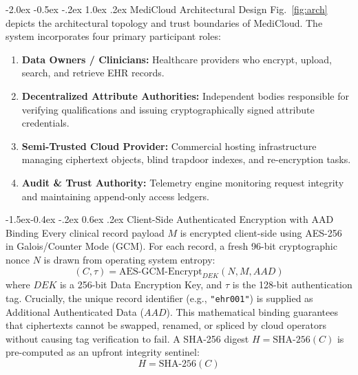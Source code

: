 \documentclass[10pt,twocolumn]{article}
\makeatletter
\renewcommand\section{\@startsection {section}{1}{\z@}%
  {-2.0ex \@plus -0.5ex \@minus -.2ex}%
  {1.0ex \@plus .2ex}%
  {\normalfont\normalsize\bfseries\scshape\color{primary}}}
\renewcommand\subsection{\@startsection{subsection}{2}{\z@}%
  {-1.5ex\@plus -0.4ex \@minus -.2ex}%
  {0.6ex \@plus .2ex}%
  {\normalfont\normalsize\bfseries\itshape\color{accent}}}
\makeatother
\begin{document}
\section{MediCloud Architectural Design}
Fig.~\ref{fig:arch} depicts the architectural topology and trust boundaries of MediCloud. The system incorporates four primary participant roles:
\begin{enumerate}
    \item \textbf{Data Owners / Clinicians:} Healthcare providers who encrypt, upload, search, and retrieve EHR records.
    \item \textbf{Decentralized Attribute Authorities:} Independent bodies responsible for verifying qualifications and issuing cryptographically signed attribute credentials.
    \item \textbf{Semi-Trusted Cloud Provider:} Commercial hosting infrastructure managing ciphertext objects, blind trapdoor indexes, and re-encryption tasks.
    \item \textbf{Audit \& Trust Authority:} Telemetry engine monitoring request integrity and maintaining append-only access ledgers.
\end{enumerate}

\subsection{Client-Side Authenticated Encryption with AAD Binding}
Every clinical record payload $M$ is encrypted client-side using AES-256 in Galois/Counter Mode (GCM). For each record, a fresh 96-bit cryptographic nonce $N$ is drawn from operating system entropy:
\begin{equation}
    (C, \tau) = \text{AES-GCM-Encrypt}_{DEK}(N, M, AAD)
\end{equation}
where $DEK$ is a 256-bit Data Encryption Key, and $\tau$ is the 128-bit authentication tag. Crucially, the unique record identifier (e.g., \texttt{"ehr001"}) is supplied as Additional Authenticated Data ($AAD$). This mathematical binding guarantees that ciphertexts cannot be swapped, renamed, or spliced by cloud operators without causing tag verification to fail. A SHA-256 digest $H = \text{SHA-256}(C)$ is pre-computed as an upfront integrity sentinel:
\begin{equation}
    H = \text{SHA-256}(C)
\end{equation}
\end{document}
